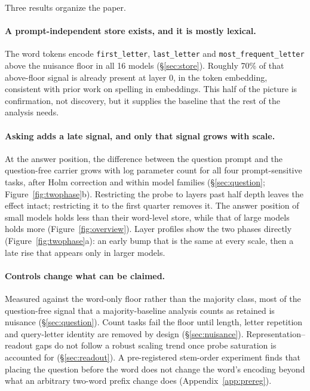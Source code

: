 Three results organize the paper.

\paragraph{A prompt-independent store exists, and it is mostly lexical.}
The word tokens encode \texttt{first\_letter}, \texttt{last\_letter} and
\texttt{most\_frequent\_letter} above the nuisance floor in all 16 models
(\S\ref{sec:store}). Roughly 70\% of that above-floor signal is already present at layer 0, in the
token embedding, consistent with prior work on spelling in embeddings. This half of the picture is
confirmation, not discovery, but it supplies the baseline that the rest of the analysis needs.

\paragraph{Asking adds a late signal, and only that signal grows with scale.}
At the answer position, the difference between the question prompt and the question-free carrier
grows with log parameter count for all four prompt-sensitive tasks, after Holm correction and
within model families (\S\ref{sec:question}; Figure~\ref{fig:twophase}b). Restricting the probe to layers past half depth
leaves the effect intact; restricting it to the first quarter removes it. The answer position of
small models holds less than their word-level store, while that of large models holds more
(Figure~\ref{fig:overview}). Layer
profiles show the two phases directly (Figure~\ref{fig:twophase}a): an early bump that is the same
at every scale, then a late rise that appears only in larger models.

\paragraph{Controls change what can be claimed.}
Measured against the word-only floor rather than the majority class, most of the question-free
signal that a majority-baseline analysis counts as retained is nuisance
(\S\ref{sec:question}). Count tasks fail the floor until length, letter repetition and query-letter
identity are removed by design (\S\ref{sec:nuisance}). Representation--readout gaps do not follow
a robust scaling trend once probe saturation is accounted for (\S\ref{sec:readout}). A
pre-registered stem-order experiment finds that placing the question before the word does not
change the word's encoding beyond what an arbitrary two-word prefix change does
(Appendix~\ref{app:prereg}).

